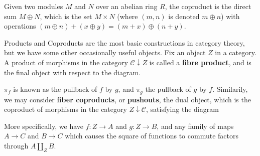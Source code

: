 \begin{example}
    Given two modules $M$ and $N$ over an abelian ring $R$, the coproduct is the direct sum $M \oplus N$, which is the set $M \times N$ (where $(m,n)$ is denoted $m \oplus n$) with operations $(m \oplus n) + (x \oplus y) = (m + x) \oplus (n + y)$.
\end{example}

Products and Coproducts are the most basic constructions in category theory, but we have some other occasionally useful objects. Fix an object $Z$ in a category. A product of morphisms in the category $\mathcal{C} \downarrow Z$ is called a {\bf fibre product}, and is the final object with respect to the diagram.
%
\begin{center}
\end{center}
%
$\pi_f$ is known as the pullback of $f$ by $g$, and $\pi_g$ the pullback of $g$ by $f$. Similarily, we may consider {\bf fiber coproducts}, or {\bf pushouts}, the dual object, which is the coproduct of morphisms in the category $Z \downarrow \mathcal{C}$, satisfying the diagram
%
\begin{center}
\end{center}
%
More specifically, we have $f: Z \to A$ and $g: Z \to B$, and any family of maps $A \to C$ and $B \to C$ which causes the square of functions to commute factors through $A \coprod_Z B$.

